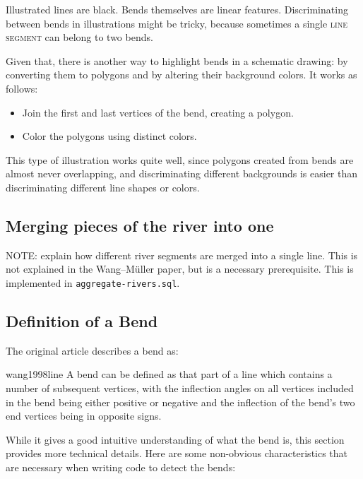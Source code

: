 \documentclass[a4paper]{article}
\newcommand{\WM}{Wang--M{\"u}ller}
\begin{document}
Illustrated lines are black. Bends themselves are linear features.
Discriminating between bends in illustrations might be tricky, because
sometimes a single \textsc{line segment} can belong to two bends.

Given that, there is another way to highlight bends in a schematic drawing: by
converting them to polygons and by altering their background colors. It works
as follows:

\begin{itemize}
    \item Join the first and last vertices of the bend, creating a polygon.
    \item Color the polygons using distinct colors.
\end{itemize}

This type of illustration works quite well, since polygons created from bends
are almost never overlapping, and discriminating different backgrounds is
easier than discriminating different line shapes or colors.

\subsection{Merging pieces of the river into one}

NOTE: explain how different river segments are merged into a single line. This
is not explained in the {\WM} paper, but is a necessary prerequisite. This is
implemented in \texttt{aggregate-rivers.sql}.

\subsection{Definition of a Bend}
\label{sec:definition-of-a-bend}

The original article describes a bend as:

\begin{displaycquote}{wang1998line}
    A bend can be defined as that part of a line which contains a number of
    subsequent vertices, with the inflection angles on all vertices included in
    the bend being either positive or negative and the inflection of the bend's
    two end vertices being in opposite signs.
\end{displaycquote}

While it gives a good intuitive understanding of what the bend is, this section
provides more technical details. Here are some non-obvious characteristics that
are necessary when writing code to detect the bends:
\end{document}
